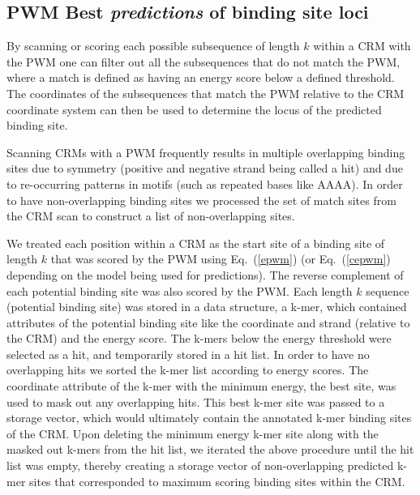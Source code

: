 	\subsection{PWM Best \textit{predictions} of binding site loci }  
By scanning or scoring each possible subsequence of length $k$ within a CRM with the PWM one can filter out all the subsequences that do not match the PWM, where a match is defined as having an energy score below a defined threshold.  The coordinates of the subsequences that match the PWM relative to the CRM coordinate system can then be used to determine the locus of the predicted binding site.
	
Scanning CRMs with a PWM frequently results in multiple overlapping binding sites due to symmetry (positive and negative strand being called a hit) and due to re-occurring patterns in motifs (such as repeated bases like AAAA).  In order to have non-overlapping binding sites we processed the set of match sites from the CRM scan to construct a list of non-overlapping sites.  
	  
We treated each position within a CRM as the start site of a binding site of length $k$ that was scored by the PWM using Eq.~(\ref{epwm}) (or Eq.~(\ref{cepwm}) depending on the model being used for predictions).  The reverse complement of each potential binding site was also scored by the PWM.  Each length $k$ sequence (potential binding site) was stored in a data structure, a k-mer, which contained attributes of the potential binding site like the coordinate and strand (relative to the CRM) and the energy score.  The k-mers below the energy threshold were selected as a hit, and temporarily stored in a hit list.  In order to have no overlapping hits we sorted the k-mer list according to energy scores.  The coordinate attribute of the k-mer with the minimum energy, the best site, was used to mask out any overlapping hits.  This best k-mer site was passed to a storage vector, which would ultimately contain the annotated k-mer binding sites of the CRM.  Upon deleting the minimum energy k-mer site along with the masked out k-mers from the hit list, we iterated the above procedure until the hit list was empty, thereby creating a storage vector of non-overlapping predicted k-mer sites that corresponded to maximum scoring binding sites within the CRM.
	
